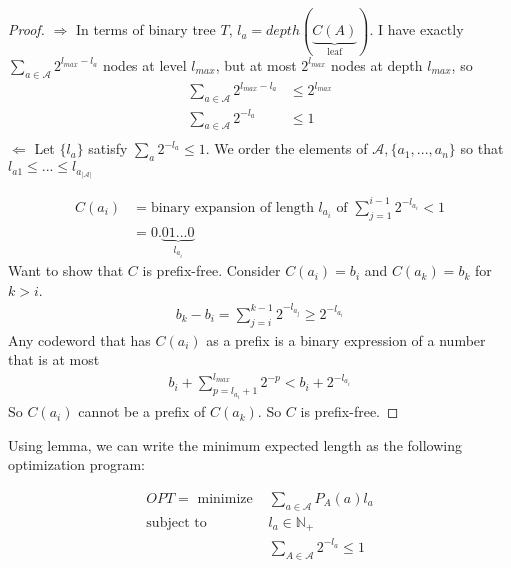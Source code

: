 \begin{proof}
$\Rightarrow$ In terms of binary tree $T$, $l_a=depth(\underbrace{C(A)}_{\text{leaf}})$. I have exactly $\sum_{a\in \mathcal{A}} 2^{l_{max}-l_a}$ nodes at level $l_{max}$, but at most $2^{l_{max}}$ nodes at depth $l_{max}$, so 
\begin{align*}
\sum_{a \in \mathcal{A}} 2^{l_{max}-l_a} & \leq 2^{l_{max}}\\
\sum_{a\in \mathcal{A}} 2^{-l_a} & \leq 1\\
\end{align*}
$\Leftarrow$ Let $\{l_a\}$ satisfy $\sum_a 2^{-l_a}\leq 1$. We order the elements of $\mathcal{A}, \{a_1,...,a_n\}$ so that $l_{a1}\leq...\leq l_{a_{|\mathcal{A}|}}$

\begin{align*}
C(a_i) & =\text{binary expansion of length $l_{a_i}$ of } \sum_{j=1}^{i-1} 2^{-l_{a_i}} <1\\
& = 0.\underbrace{01...0}_{l_{a_i}}
\end{align*}
Want to show that $C$ is prefix-free. Consider $C(a_i)=b_i$ and $C(a_k)=b_k$ for $k>i$.
\begin{align*}
b_k-b_i=\sum_{j=i}^{k-1}2^{-l_{a_j}}\geq 2^{-l_{a_i}}
\end{align*}
Any codeword that has $C(a_i)$ as a prefix is a binary expression of a number that is at most
\begin{align*}
b_i+\sum_{p=l_{a_i}+1}^{l_{max}}2^{-p}<b_i + 2^{-l_{a_i}}
\end{align*}
So $C(a_i)$ cannot be a prefix of $C(a_k)$. So $C$ is prefix-free.
\end{proof}

Using lemma, we can write the minimum expected length as the following optimization program:

\begin{align*}
OPT=\text{ minimize } & \sum_{a\in \mathcal{A}}P_A(a)l_a\\
\text{subject to } & l_a\in \mathbb{N}_+\\
& \sum_{A\in \mathcal{A}} 2^{-l_a}\leq 1
\end{align*}

